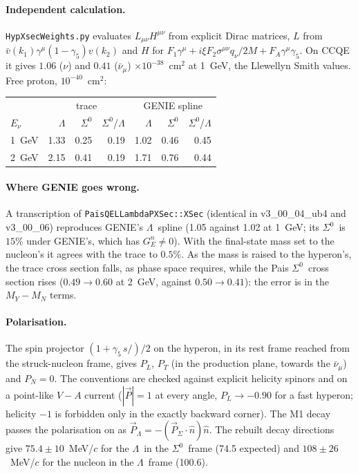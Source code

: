 \documentclass[11pt,a4paper]{article}
\newcommand{\Szero}{\ensuremath{\Sigma^{0}}}
\newcommand{\Lam}{\ensuremath{\Lambda}}
\newcommand{\numubar}{\ensuremath{\bar{\nu}_\mu}}
\begin{document}
\paragraph{Independent calculation.} \texttt{HypXsecWeights.py} evaluates $L_{\mu\nu}
H^{\mu\nu}$ from explicit Dirac matrices, $L$ from $\bar v(k_1)\gamma^\mu(1-\gamma_5)
v(k_2)$ and $H$ for $F_1\gamma^\mu+i\xi F_2\sigma^{\mu\nu}q_\nu/2M+F_A\gamma^\mu\gamma_5$. On
CCQE it gives $1.06$ ($\nu$) and $0.41$ ($\numubar$) $\times10^{-38}$~cm$^2$ at 1~GeV, the
Llewellyn Smith values. Free proton, $10^{-40}$~cm$^2$:
\begin{center}
\small
\begin{tabular}{lrrrrrr}
\toprule
 & \multicolumn{3}{c}{trace} & \multicolumn{3}{c}{GENIE spline} \\
$E_\nu$ & \Lam & \Szero & \Szero/\Lam & \Lam & \Szero & \Szero/\Lam \\
\midrule
1~GeV & 1.33 & 0.25 & 0.19 & 1.02 & 0.46 & 0.45 \\
2~GeV & 2.15 & 0.41 & 0.19 & 1.71 & 0.76 & 0.44 \\
\bottomrule
\end{tabular}
\end{center}

\paragraph{Where GENIE goes wrong.} A transcription of
\texttt{PaisQELLambdaPXSec::XSec} (identical in v3\_00\_04\_ub4 and v3\_00\_06) reproduces
GENIE's \Lam\ spline (1.05 against 1.02 at 1~GeV; its \Szero\ is $15\%$ under GENIE's,
which has $G_E^n\neq0$). With the final-state mass set to the nucleon's it agrees with the
trace to $0.5\%$. As the mass is raised to the hyperon's, the trace cross section falls,
as phase space requires, while the Pais \Szero\ cross section rises ($0.49\to0.60$ at
2~GeV, against $0.50\to0.41$): the error is in the $M_Y-M_N$ terms.

\paragraph{Polarisation.} The spin projector $(1+\gamma_5\,s\!\!\!/)/2$ on the hyperon,
in its rest frame reached from the struck-nucleon frame, gives $P_L$, $P_T$ (in the
production plane, towards the $\numubar$) and $P_N=0$. The conventions are checked against
explicit helicity spinors and on a point-like $V-A$ current ($|\vec P|=1$ at every angle,
$P_L\to-0.90$ for a fast hyperon; helicity $-1$ is forbidden only in the exactly backward
corner). The M1 decay passes the polarisation on as $\vec P_\Lam=-(\vec P_\Sigma\cdot\hat
n)\hat n$. The rebuilt decay directions give $75.4\pm10$~MeV/$c$ for the \Lam\ in the
\Szero\ frame (74.5 expected) and $108\pm26$~MeV/$c$ for the nucleon in the \Lam\ frame
(100.6).
\end{document}
